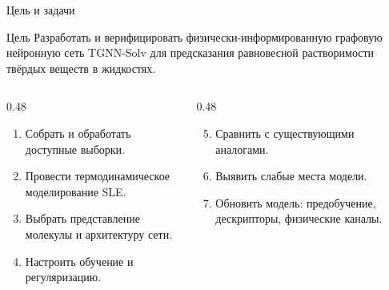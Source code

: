 \documentclass[aspectratio=169,10pt]{beamer}
\newcommand{\tightitems}{\setlength{\itemsep}{0.25em}}
\begin{document}
\begin{frame}{Цель и задачи}
  \small
  \begin{block}{Цель}
    Разработать и верифицировать физически-информированную графовую нейронную сеть TGNN-Solv для предсказания равновесной растворимости твёрдых веществ в жидкостях.
  \end{block}
  \vspace{0.2em}
  \begin{columns}[T,onlytextwidth]
    \begin{column}{0.48\textwidth}
      \begin{enumerate}\tightitems
        \item Собрать и обработать доступные выборки.
        \item Провести термодинамическое моделирование SLE.
        \item Выбрать представление молекулы и архитектуру сети.
        \item Настроить обучение и регуляризацию.
      \end{enumerate}
    \end{column}
    \begin{column}{0.48\textwidth}
      \begin{enumerate}\setcounter{enumi}{4}\tightitems
        \item Сравнить с существующими аналогами.
        \item Выявить слабые места модели.
        \item Обновить модель: предобучение, дескрипторы, физические каналы.
      \end{enumerate}
    \end{column}
  \end{columns}
\end{frame}
\end{document}
